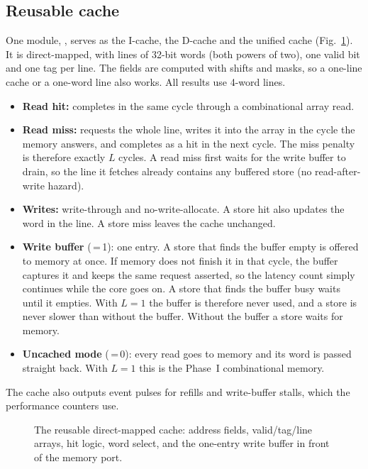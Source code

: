 \subsection{Reusable cache}
One module, , serves as the I-cache, the D-cache and the unified cache
(Fig.~\ref{fig:cache}). It is direct-mapped, with  lines of 
32-bit words (both powers of two), one valid bit and one tag per line. The fields are computed
with shifts and masks, so a one-line cache or a one-word line also works. All results use
4-word lines.
\begin{itemize}
  \item \textbf{Read hit:} completes in the same cycle through a combinational array read.
  \item \textbf{Read miss:} requests the whole line, writes it into the array in the cycle the
        memory answers, and completes as a hit in the next cycle. The miss penalty is
        therefore exactly $L$ cycles. A read miss first waits for the write buffer to drain,
        so the line it fetches already contains any buffered store (no read-after-write
        hazard).
  \item \textbf{Writes:} write-through and no-write-allocate. A store hit also updates the
        word in the line. A store miss leaves the cache unchanged.
  \item \textbf{Write buffer} (\,=\,1): one entry. A store that finds the buffer
        empty is offered to memory at once. If memory does not finish it in that cycle, the
        buffer captures it and keeps the same request asserted, so the latency count simply
        continues while the core goes on. A store that finds the buffer busy waits until it
        empties. With $L=1$ the buffer is therefore never used, and a store is never slower
        than without the buffer. Without the buffer a store waits for memory.
  \item \textbf{Uncached mode} (\,=\,0): every read goes to memory and its word is
        passed straight back. With $L=1$ this is the Phase~I combinational memory.
\end{itemize}
The cache also outputs event pulses for refills and write-buffer stalls, which the performance
counters use.

\begin{figure}[t]
  \centering
  \resizebox{0.92\columnwidth}{!}{}
  \caption{The reusable direct-mapped cache: address fields, valid/tag/line arrays, hit logic,
  word select, and the one-entry write buffer in front of the memory port.}
  \label{fig:cache}
\end{figure}

